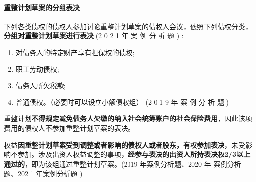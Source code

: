 \documentclass[UTF8,12pt]{ctexart}
\numberwithin{equation}{section} %
\numberwithin{figure}{section}
\numberwithin{table}{section}
\begin{document}
	
	\paragraph{重整计划草案的分组表决}
	
	下列各类债权的债权人参加讨论重整计划草案的债权人会议，依照下列债权分类，\textbf{分组对重整计划草案进行表决} (2 0 2 1 年 案 例 分 析 题 ) :
	\begin{enumerate}
		\item 对债务人的特定财产享有担保权的债权;
		
		\item 职工劳动债权;
		
		\item 债务人所欠税款;
		
		\item 普通债权。（必要时可以设立小额债权组） (2 0 1 9 年 案 例 分 析 题 )
	\end{enumerate}
	重整计划\textbf{不得规定减免债务人欠缴的纳入社会统筹账户的社会保险费用}，因此该项费用的债权人不参加重整计划草案的表决。
	
	权益\textbf{因重整计划草案受到调整或者影响的债权人或者股东，有权参加表决}，未受影响不参加。涉及出资人权益调整的事项，\textbf{经参与表决的出资人所持表决权2/3以上通过的}，即为该组通过重整计划草案。(2019 年案例分析题、2020 年 案例分析题、202 1 年案例分析题 )
	
\end{document}
